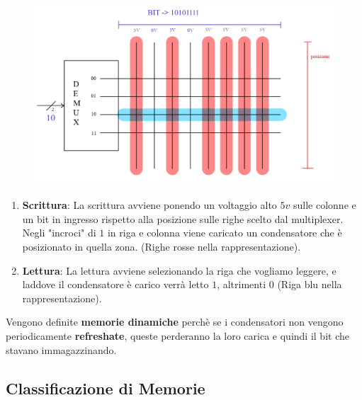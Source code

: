 \documentclass{article}
\begin{document}
\begin{figure}[htbp]
    \includegraphics[scale=0.325]{img/memoriaDinamica1.png}
    \centering
\end{figure}

\begin{enumerate}
    \item \textbf{Scrittura}: La scrittura avviene ponendo un voltaggio alto $5v$ sulle colonne e un bit in ingresso rispetto alla posizione sulle righe scelto dal multiplexer. Negli "incroci" di $1$ in riga e colonna viene caricato un condensatore che è posizionato in quella zona.
    (Righe rosse nella rappresentazione).
    \item \textbf{Lettura}: La lettura avviene selezionando la riga che vogliamo leggere, e laddove il condensatore è carico verrà letto $1$, altrimenti $0$ (Riga blu nella rappresentazione).
\end{enumerate}

Vengono definite \textbf{memorie dinamiche} perchè se i condensatori non vengono periodicamente \textbf{refreshate}, queste perderanno la loro carica e quindi il bit che stavano immagazzinando.

\subsection{Classificazione di Memorie}
\end{document}
